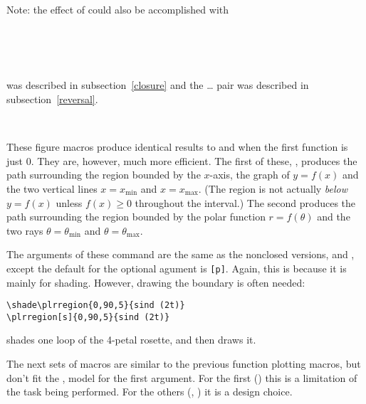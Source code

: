 \documentclass[letterpaper]{article}
\begin{document}
Note: the effect of  could also be accomplished with
\begin{ex}
  \\
    \\
    \\
\end{ex}
 was described in subsection~\ref{closure} and the
\dots{} pair was described in
subsection~\ref{reversal}.

\begin{cd}
%
    \\
%
%
\end{cd}

These figure macros produce identical results to  and
 when the first function is just $0$. They are, however,
much more efficient.  The first of these, , produces the
path surrounding the region bounded by the $x$-axis, the graph of
$y=f(x)$ and the two vertical lines $x=x_{\mathrm{min}}$ and $x =
x_{\mathrm{max}}$. (The region is not actually \emph{below} $y = f(x)$
unless $f(x) \ge 0$ throughout the interval.) The second produces the
path surrounding the region bounded by the polar function $r =
f(\theta)$ and the two rays $\theta=\theta_{\mathrm{min}}$ and
$\theta=\theta_{\mathrm{max}}$.

The arguments of these command are the same as the nonclosed versions,
 and , except the default for the optional
agument is \texttt{[p]}. Again, this is because it is mainly for
shading. However, drawing the boundary is often needed:
\begin{verbatim}
\shade\plrregion{0,90,5}{sind (2t)}
\plrregion[s]{0,90,5}{sind (2t)}
\end{verbatim}
shades one loop of the 4-petal rosette, and then draws it.

The next sets of macros are similar to the previous function plotting
macros, but don't fit the ,   model for
the first argument. For the first () this is a limitation
of the task being performed. For the others (,
) it is a design choice.
\end{document}
